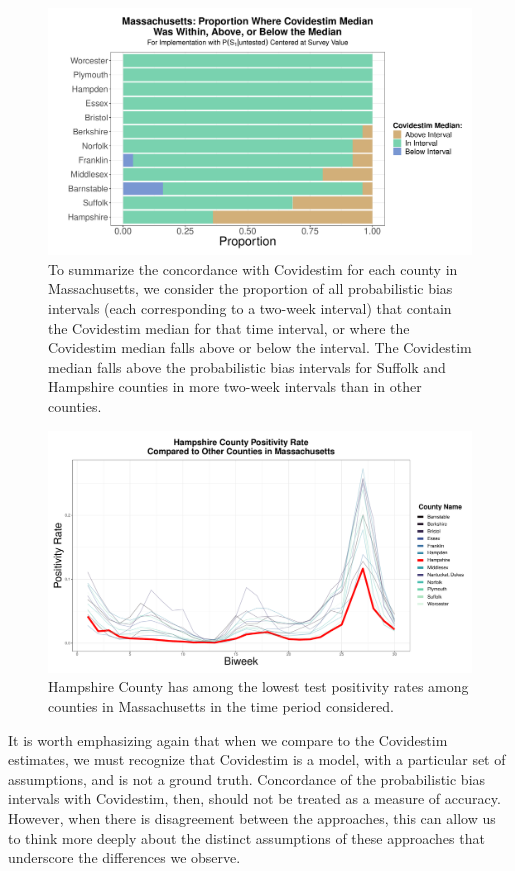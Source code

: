 \documentclass[12pt,twoside]{smiththesis}
\begin{document}
\begin{figure}
\includegraphics[width=1\linewidth]{figure/covidestim_above_below_by_county_ma} \caption{\label{fig:above-below-by-county-ma} To summarize the concordance with Covidestim for each county in Massachusetts, we consider the proportion of all probabilistic bias intervals (each corresponding to a two-week interval) that contain the Covidestim median for that time interval, or where the Covidestim median falls above or below the interval. The Covidestim median falls above the probabilistic bias intervals for Suffolk and Hampshire counties in more two-week intervals than in other counties.}\label{fig:unnamed-chunk-79}
\end{figure}
\begin{figure}
\includegraphics[width=0.9\linewidth]{figure/hampshire} \caption{\label{fig:hamp}Hampshire County has among the lowest test positivity rates among counties in Massachusetts in the time period considered.}\label{fig:unnamed-chunk-80}
\end{figure}
It is worth emphasizing again that when we compare to the Covidestim estimates, we must recognize that Covidestim is a model, with a particular set of assumptions, and is not a ground truth. Concordance of the probabilistic bias intervals with Covidestim, then, should not be treated as a measure of accuracy. However, when there is disagreement between the approaches, this can allow us to think more deeply about the distinct assumptions of these approaches that underscore the differences we observe.
\end{document}

